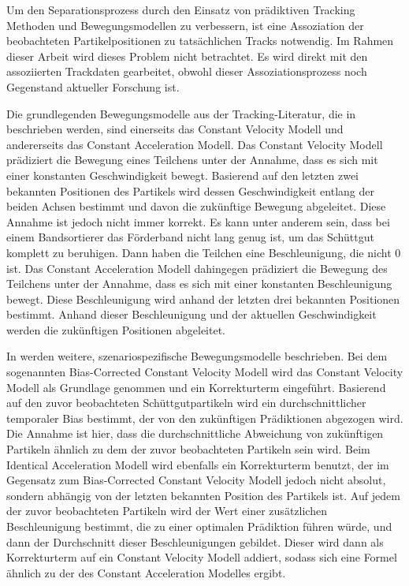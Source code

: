 Um den Separationsprozess durch den Einsatz von prädiktiven Tracking Methoden und Bewegungsmodellen zu verbessern, ist eine Assoziation 
der beobachteten Partikelpositionen zu tatsächlichen Tracks notwendig. 
Im Rahmen dieser Arbeit wird dieses Problem nicht betrachtet. 
Es wird direkt mit den assoziierten Trackdaten gearbeitet, 
obwohl dieser Assoziationsprozess noch Gegenstand aktueller Forschung ist.

Die grundlegenden Bewegungsmodelle aus der Tracking-Literatur, die in \cite{Pfaff2018} beschrieben werden,
sind einerseits das Constant Velocity Modell und andererseits das Constant Acceleration Modell.
Das Constant Velocity Modell prädiziert die Bewegung eines Teilchens unter der Annahme, dass es sich mit einer konstanten Geschwindigkeit bewegt.
Basierend auf den letzten zwei bekannten Positionen des Partikels wird dessen Geschwindigkeit entlang der beiden Achsen bestimmt 
und davon die zukünftige Bewegung abgeleitet.
Diese Annahme ist jedoch nicht immer korrekt.
Es kann unter anderem sein, dass bei einem Bandsortierer das Förderband nicht lang genug ist, um das Schüttgut komplett zu beruhigen.
Dann haben die Teilchen eine Beschleunigung, die nicht 0 ist.
Das Constant Acceleration Modell dahingegen prädiziert die Bewegung des Teilchens unter der Annahme, dass es sich mit einer konstanten Beschleunigung bewegt.
Diese Beschleunigung wird anhand der letzten drei bekannten Positionen bestimmt.
Anhand dieser Beschleunigung und der aktuellen Geschwindigkeit werden die zukünftigen Positionen abgeleitet.

In \cite{Pfaff2018} werden weitere, szenariospezifische Bewegungsmodelle beschrieben.
Bei dem sogenannten Bias-Corrected Constant Velocity Modell wird das Constant Velocity Modell als Grundlage genommen und ein Korrekturterm eingeführt.
Basierend auf den zuvor beobachteten Schüttgutpartikeln wird ein durchschnittlicher temporaler Bias bestimmt, der von den zukünftigen Prädiktionen abgezogen wird.
Die Annahme ist hier, dass die durchschnittliche Abweichung von zukünftigen Partikeln ähnlich zu dem der zuvor beobachteten Partikeln sein wird.
Beim Identical Acceleration Modell wird ebenfalls ein Korrekturterm benutzt, 
der im Gegensatz zum Bias-Corrected Constant Velocity Modell jedoch nicht absolut, sondern abhängig von der letzten bekannten Position des Partikels ist.
Auf jedem der zuvor beobachteten Partikeln wird der Wert einer zusätzlichen Beschleunigung bestimmt, die zu einer optimalen Prädiktion führen würde,
und dann der Durchschnitt dieser Beschleunigungen gebildet.
Dieser wird dann als Korrekturterm auf ein Constant Velocity Modell addiert, sodass sich eine Formel ähnlich zu der des Constant Acceleration Modelles ergibt.

